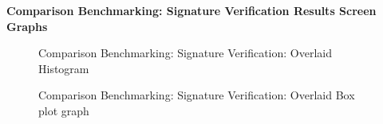 \documentclass[]{final_report}
\begin{document}
\textbf{Comparison Benchmarking: Signature Verification Results Screen Graphs}


\begin{figure}[H]
    \centering %
    
    \begin{minipage}{0.7\textwidth}
        \centering
       \caption{Comparison Benchmarking: Signature Verification: Overlaid Histogram}
        \label{fig:image1}
    \end{minipage}
    \hfill %
    \begin{minipage}{0.7\textwidth}
        \centering
       \caption{Comparison Benchmarking: Signature Verification: Overlaid Box plot graph}

\end{minipage}
\end{figure}
\end{document}

